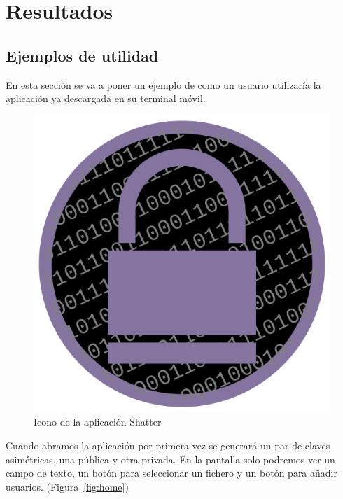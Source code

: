 
\chapter{Resultados} %

\label{Chapter5} %


\section{Ejemplos de utilidad}

En esta sección se va a poner un ejemplo de como un usuario utilizaría la
aplicación ya descargada en su terminal móvil.

\begin{figure}[ht]
  \centering
  \includegraphics[scale=0.2]{Figures/launcher}
  \decoRule
  \caption[Shatter (Icono)]{Icono de la aplicación Shatter}
  \label{fig:launcher}
\end{figure}

Cuando abramos la aplicación por primera vez se generará un par de claves
asimétricas, una pública y otra privada. En la pantalla solo podremos ver un
campo de texto, un botón para seleccionar un fichero y un botón para añadir
usuarios. (Figura~\ref{fig:home})


